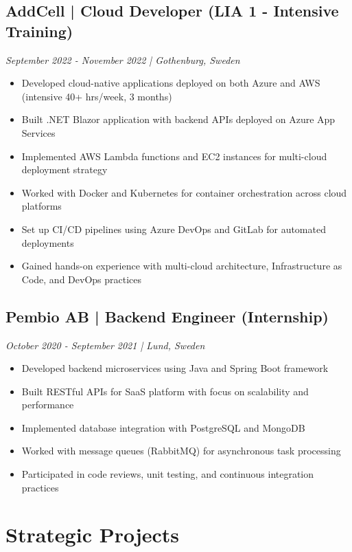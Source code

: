\documentclass[11pt,a4paper]{article}
\begin{document}
\subsection*{AddCell | Cloud Developer (LIA 1 - Intensive Training)}
\textit{September 2022 - November 2022 | Gothenburg, Sweden}
\begin{itemize}[noitemsep]
\item Developed cloud-native applications deployed on both Azure and AWS (intensive 40+ hrs/week, 3 months)
\item Built .NET Blazor application with backend APIs deployed on Azure App Services
\item Implemented AWS Lambda functions and EC2 instances for multi-cloud deployment strategy
\item Worked with Docker and Kubernetes for container orchestration across cloud platforms
\item Set up CI/CD pipelines using Azure DevOps and GitLab for automated deployments
\item Gained hands-on experience with multi-cloud architecture, Infrastructure as Code, and DevOps practices
\end{itemize}

\subsection*{Pembio AB | Backend Engineer (Internship)}
\textit{October 2020 - September 2021 | Lund, Sweden}
\begin{itemize}[noitemsep]
\item Developed backend microservices using Java and Spring Boot framework
\item Built RESTful APIs for SaaS platform with focus on scalability and performance
\item Implemented database integration with PostgreSQL and MongoDB
\item Worked with message queues (RabbitMQ) for asynchronous task processing
\item Participated in code reviews, unit testing, and continuous integration practices
\end{itemize}

\section*{Strategic Projects}
\end{document}
